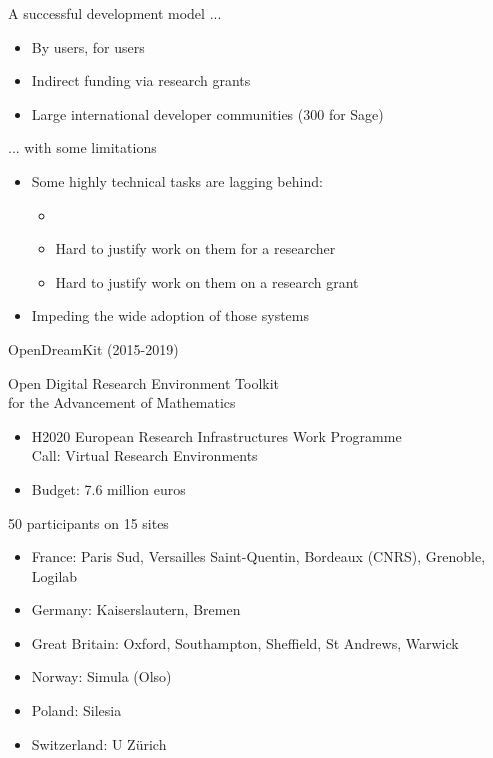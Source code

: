 \documentclass[
  usenames,svgnames, %
  compress,
  ]{beamer}
\begin{document}
\begin{frame}
  \begin{block}{A successful development model ...}
    \begin{itemize}
    \item By users, for users
    \item Indirect funding via research grants
    \item Large international developer communities (300 for Sage)
    \end{itemize}
  \end{block}

  \begin{block}{... with some limitations}
    \begin{itemize}
    \item Some highly technical tasks are lagging behind:
      \begin{itemize}
      \item \item Hard to justify work on them for a researcher
      \item Hard to justify work on them on a research grant
      \end{itemize}
    \item Impeding the wide adoption of those systems
    \end{itemize}
  \end{block}
\end{frame}

\begin{frame}{OpenDreamKit (2015-2019)}
  \begin{block}{Open Digital Research Environment Toolkit\\
    for the Advancement of Mathematics}
    \begin{itemize}
    \item H2020 European Research Infrastructures Work
      Programme\\
 Call: Virtual Research Environments
    \item Budget: 7.6 million euros
    \end{itemize}
  \end{block}

\begin{block}{50 participants on 15 sites}
    \begin{itemize}
    \item France: Paris Sud, Versailles Saint-Quentin, Bordeaux
      (CNRS), Grenoble, Logilab
    \item Germany: Kaiserslautern, Bremen
    \item Great Britain: Oxford, Southampton, Sheffield, St Andrews, Warwick
    \item Norway: Simula (Olso)
    \item Poland: Silesia
    \item Switzerland: U Zürich
    \end{itemize}
  \end{block}
\end{frame}
\end{document}
